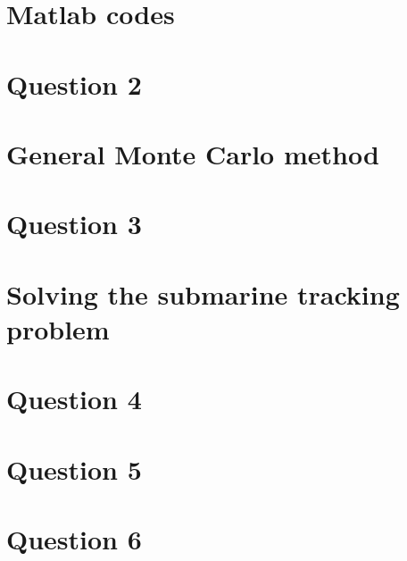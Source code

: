 \documentclass[english,DIV=13]{scrreprt}
\begin{document}
\newpage
\chapter{Matlab codes}
\label{codes}
\appendix
\chapter*{Question 2}


\chapter*{General Monte Carlo method}
\chapter*{Question 3}


\chapter*{Solving the submarine tracking problem}

\chapter*{Question 4}

\chapter*{Question 5}


\chapter*{Question 6}
\end{document}
